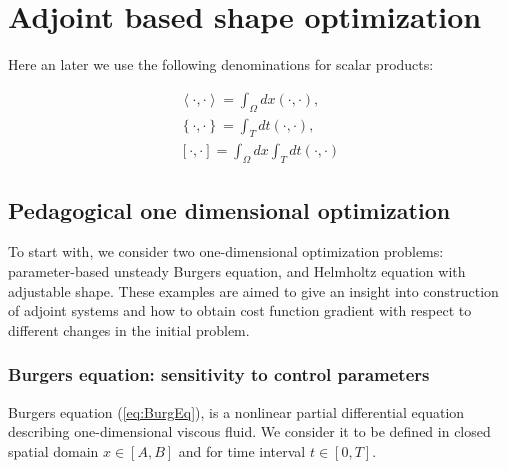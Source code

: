 
\chapter{Adjoint based shape optimization}

\ifpdf
    \graphicspath{{Chapter2/Figs/Raster/}{Chapter2/Figs/PDF/}{Chapter2/Figs/}}
\else
    \graphicspath{{Chapter2/Figs/Vector/}{Chapter2/Figs/}}
\fi

Here an later we use the following denominations for scalar products:

\begin{subequations}
\begin{align}
          \left< \cdot, \cdot \right> = \int_{\Omega} dx (\cdot, \cdot ), \\
          \left\{ \cdot, \cdot \right\} = \int_{T} dt (\cdot, \cdot ), \\
          \left[ \cdot, \cdot  \right] = \int_{\Omega} dx\int_{T} dt (\cdot, \cdot )
\end{align}
\end{subequations}


\section{Pedagogical one dimensional optimization}

To start with, we consider two one-dimensional optimization problems: parameter-based unsteady Burgers equation, and Helmholtz equation with adjustable shape. These examples are aimed to give an insight into construction of adjoint systems and how to obtain cost function gradient with respect to different changes in the initial problem.

\subsection{Burgers equation: sensitivity to control parameters}

Burgers equation (\ref{eq:BurgEq}), is a nonlinear partial differential equation describing one-dimensional viscous fluid. We consider it to be defined in closed spatial domain $x \in [A,B]$ and for time interval $t \in [0, T]$.

